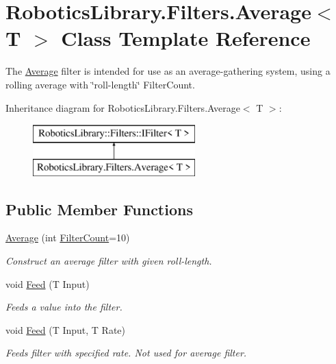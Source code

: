 \hypertarget{class_robotics_library_1_1_filters_1_1_average}{}\section{Robotics\+Library.\+Filters.\+Average$<$ T $>$ Class Template Reference}
\label{class_robotics_library_1_1_filters_1_1_average}


The \hyperlink{class_robotics_library_1_1_filters_1_1_average}{Average} filter is intended for use as an average-\/gathering system, using a rolling average with \char`\"{}roll-\/length\char`\"{} {\ttfamily Filter\+Count}. 


Inheritance diagram for Robotics\+Library.\+Filters.\+Average$<$ T $>$\+:\begin{figure}[H]
\begin{center}
\leavevmode
\includegraphics[height=2.000000cm]{d3/d9f/class_robotics_library_1_1_filters_1_1_average}
\end{center}
\end{figure}
\subsection*{Public Member Functions}
\begin{DoxyCompactItemize}
\item 
\hyperlink{class_robotics_library_1_1_filters_1_1_average_aa1f1ba91014e9fe0b966650b9ccbf514}{Average} (int \hyperlink{class_robotics_library_1_1_filters_1_1_average_a8db578c17df74d38278a0bcc18ca1d49}{Filter\+Count}=10)
\begin{DoxyCompactList}\small\item\em Construct an average filter with given roll-\/length. \end{DoxyCompactList}\item 
void \hyperlink{class_robotics_library_1_1_filters_1_1_average_a27479a3706425bb721a7694acd388cdd}{Feed} (T Input)
\begin{DoxyCompactList}\small\item\em Feeds a value into the filter. \end{DoxyCompactList}\item 
void \hyperlink{class_robotics_library_1_1_filters_1_1_average_a009ada38087402e4c8f5c3f3390123c8}{Feed} (T Input, T Rate)
\begin{DoxyCompactList}\small\item\em Feeds filter with specified rate. Not used for average filter. \end{DoxyCompactList}\end{DoxyCompactItemize}
